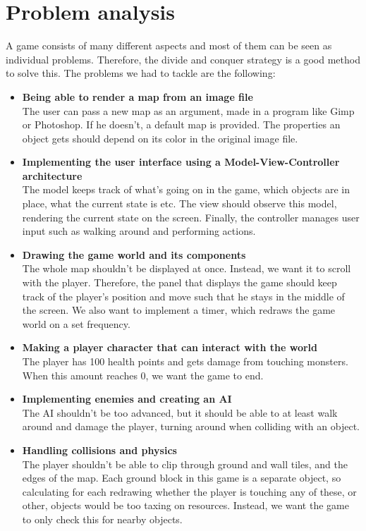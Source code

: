 \documentclass[a4paper,10pt,twoside]{article}
\begin{document}

\section{Problem analysis}
A game consists of many different aspects and most of them can be seen as individual problems.
Therefore, the divide and conquer strategy is a good method to solve this.
The problems we had to tackle are the following:
\begin{itemize}
\item \textbf{Being able to render a map from an image file}\\
The user can pass a new map as an argument, made in a program like Gimp or Photoshop. If he doesn't, a default map is provided. The properties an object gets should depend on its color in the original image file. 
\item \textbf{Implementing the user interface using a Model-View-Controller architecture}\\
The model keeps track of what's going on in the game, which objects are in place, what the current state is etc. The view should observe this model, rendering the current state on the screen. Finally, the controller manages user input such as walking around and performing actions.
\item \textbf{Drawing the game world and its components}\\
The whole map shouldn't be displayed at once. Instead, we want it to scroll with the player. Therefore, the panel that displays the game should keep track of the player's position and move such that he stays in the middle of the screen. We also want to implement a timer, which redraws the game world on a set frequency.
\item \textbf{Making a player character that can interact with the world}\\
The player has 100 health points and gets damage from touching monsters. When this amount reaches 0, we want the game to end.
\item \textbf{Implementing enemies and creating an AI}\\
The AI shouldn't be too advanced, but it should be able to at least walk around and damage the player, turning around when colliding with an object. 
\item \textbf{Handling collisions and physics}\\
The player shouldn't be able to clip through ground and wall tiles, and the edges of the map. Each ground block in this game is a separate object, so calculating for each redrawing whether the player is touching any of these, or other, objects would be too taxing on resources. Instead, we want the game to only check this for nearby objects.


\end{itemize}
\end{document}
